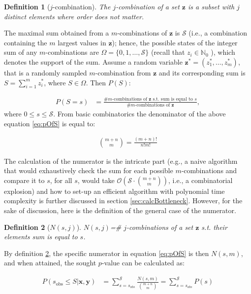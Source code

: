 \documentclass[a4paper,11pt]{article}
\newtheorem{mydef}{Definition}
\begin{document}
\begin{mydef}[$j$-combination] The $j$-combination of a set $\bm{z}$ is a subset with $j$ distinct elements where order does not matter.\end{mydef}

The maximal sum obtained from a $m$-combinations of $\bm{z}$ is $\mathcal{S}$ (i.e., a combination containing the $m$ largest values in $\bm{z}$); hence, the possible states of the integer sum of any $m$-combinations are $\Omega=\{0,1,\ldots,\mathcal{S}\}$ (recall that $z_{i}\in \mathbb{N}_0$ ), which denotes the support of the sum. Assume a random variable $\bm{z}^{*}=(z^{*}_1,\ldots,z^{*}_m)$, that is a randomly sampled $m$-combination from $\bm{z}$ and its corresponding sum is $S=\sum_{i=1}^m z^{*}_i$, where $S\in \Omega$. Then $P(S)$:

\begin{align}
\label{eq:pOfS}
P(S = s) &= \frac{\text{\# $m$-combinations of $\bm{z}$ s.t. sum is equal to $s$}}{\text{\# $m$-combinations of $\bm{z}$}},
\end{align}
where $0\leq s \leq \mathcal{S}$. From basic combinatorics the denominator of the above equation \ref{eq:pOfS} is equal to:

\begin{align*}
{m+n \choose m} = \frac{(m+n)!}{n!m!}
\end{align*}

The calculation of the numerator is the intricate part (e.g., a naive algorithm that would exhaustively check the sum for each possible $m$-combinations and compare it to $s$, for all $s$, would take $\mathcal{O}(\mathcal{S} \cdot {m+n \choose m})$, i.e., a combinatorial explosion) and how to set-up an efficient algorithm with polynomial time complexity is further discussed in section \ref{sec:calcBottleneck}. However, for the sake of discussion, here is the definition of the general case of the numerator.
\begin{mydef}[$N(s,j)$]
\label{def:numerator}
$N(s,j)$=\# $j$-combinations of a set $\bm{z}$ s.t. their elements sum is equal to $s$.
\end{mydef}

By definition \ref{def:numerator}, the specific numerator in equation \ref{eq:pOfS} is then $N(s,m)$, and when attained, the sought $p$-value can be calculated as:

\begin{align}
P(s_{\text{obs}} \leq S | \bm{x}, \bm{y}) &= \sum _{s=s_{obs}}^{\mathcal{S}}\frac{N(s,m)}{{m+n \choose m}}=\sum _{s=s_{obs}}^{\mathcal{S}}P(s)
\end{align}
\end{document}
